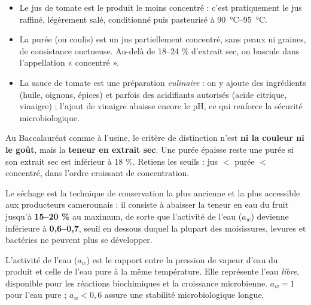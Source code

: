\documentclass[11pt]{article}
\newcommand{\cle}[1]{{\popxbold\color{popdark}#1}}
\newcounter{popsec}
\newcounter{popsub}
\newcommand{\courssub}[1]{%
  \stepcounter{popsub}%
  \par\vspace{9pt}\noindent{\popxbold\fontsize{11.5}{13}\selectfont\color{popink}{\color{poporange}\thepopsec.\thepopsub}\hspace{6pt}#1}\par\nopagebreak\vspace{4pt}
}
\begin{document}
\begin{itemize}
\item Le \cle{jus de tomate} est le produit le moins concentré : c'est pratiquement le jus raffiné, légèrement salé, conditionné puis pasteurisé à \SI{90}{\celsius}--\SI{95}{\celsius}.
\item La \cle{purée} (ou coulis) est un jus partiellement concentré, sans peaux ni graines, de consistance onctueuse. Au-delà de 18--24 \% d'extrait sec, on bascule dans l'appellation « concentré ».
\item La \cle{sauce de tomate} est une préparation \emph{culinaire} : on y ajoute des ingrédients (huile, oignons, épices) et parfois des acidifiants autorisés (acide citrique, vinaigre) ; l'ajout de vinaigre abaisse encore le pH, ce qui renforce la sécurité microbiologique.
\end{itemize}

\begin{attention}
Au Baccalauréat comme à l'usine, le critère de distinction n'est \textbf{ni la couleur ni le goût}, mais la \textbf{teneur en extrait sec}. Une purée épaisse reste une purée si son extrait sec est inférieur à 18 \%. Retiens les seuils : jus $<$ purée $<$ concentré, dans l'ordre croissant de concentration.
\end{attention}

\courssub{Le séchage de la tomate}

Le séchage est la technique de conservation la plus ancienne et la plus accessible aux producteurs camerounais : il consiste à abaisser la teneur en eau du fruit jusqu'à \textbf{15--20 \%} au maximum, de sorte que l'\cle{activité de l'eau} ($a_w$) devienne inférieure à \textbf{0,6--0,7}, seuil en dessous duquel la plupart des moisissures, levures et bactéries ne peuvent plus se développer.

\begin{definition}
L'activité de l'eau ($a_w$) est le rapport entre la pression de vapeur d'eau du produit et celle de l'eau pure à la même température. Elle représente l'eau \emph{libre}, disponible pour les réactions biochimiques et la croissance microbienne. $a_w = 1$ pour l'eau pure ; $a_w < 0,6$ assure une stabilité microbiologique longue.
\end{definition}
\end{document}
